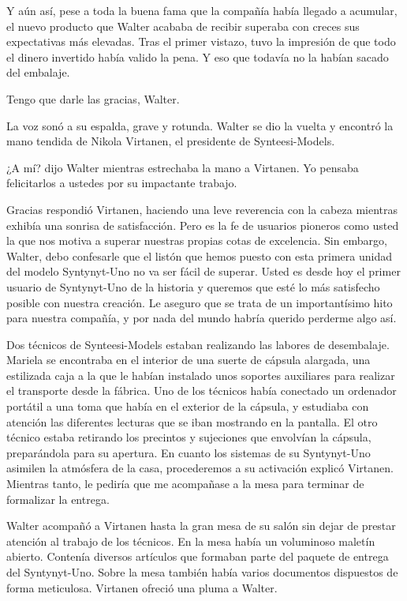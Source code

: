 Y aún así, pese a toda la buena fama que la compañía había llegado a acumular, el nuevo producto que Walter acababa de recibir superaba con creces sus expectativas más elevadas. Tras el primer vistazo, tuvo la impresión de que todo el dinero invertido había valido la pena. Y eso que todavía no la habían sacado del embalaje.
	
	\reply Tengo que darle las gracias, Walter.

La voz sonó a su espalda, grave y rotunda. Walter se dio la vuelta y encontró la mano tendida de Nikola Virtanen, el presidente de Synteesi-Models.
	
	\reply ¿A mí? \pause dijo Walter mientras estrechaba la mano a Virtanen\pauseend. Yo pensaba felicitarlos a ustedes por su impactante trabajo.
	
	\reply Gracias \pause respondió Virtanen, haciendo una leve reverencia con la cabeza mientras exhibía una sonrisa de satisfacción\pauseend. Pero es la fe de usuarios pioneros como usted la que nos motiva a superar nuestras propias cotas de excelencia. Sin embargo, Walter, debo confesarle que el listón que hemos puesto con esta primera unidad del modelo Syntynyt-Uno no va ser fácil de superar. Usted es desde hoy el primer usuario de Syntynyt-Uno de la historia y queremos que esté lo más satisfecho posible con nuestra creación. Le aseguro que se trata de un importantísimo hito para nuestra compañía, y por nada del mundo habría querido perderme algo así.

Dos técnicos de Synteesi-Models estaban realizando las labores de desembalaje. Mariela se encontraba en el interior de una suerte de cápsula alargada, una estilizada caja a la que le habían instalado unos soportes auxiliares para realizar el transporte desde la fábrica. Uno de los técnicos había conectado un ordenador portátil a una toma que había en el exterior de la cápsula, y estudiaba con atención las diferentes lecturas que se iban mostrando en la pantalla. El otro técnico estaba retirando los precintos y sujeciones que envolvían la cápsula, preparándola para su apertura.
	\reply En cuanto los sistemas de su Syntynyt-Uno asimilen la atmósfera de la casa, procederemos a su activación \pause explicó Virtanen\pauseend. Mientras tanto, le pediría que me acompañase a la mesa para terminar de formalizar la entrega.
	
Walter acompañó a Virtanen hasta la gran mesa de su salón sin dejar de prestar atención al trabajo de los técnicos. En la mesa había un voluminoso maletín abierto. Contenía diversos artículos que formaban parte del paquete de entrega del Syntynyt-Uno. Sobre la mesa también había varios documentos dispuestos de forma meticulosa. Virtanen ofreció una pluma a Walter.
	
